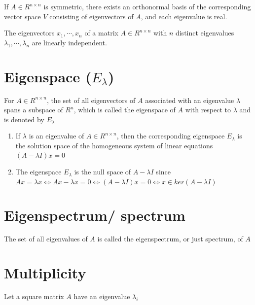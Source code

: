 \begin{theorem}
    If $A \in  R^{n\times n}$ is symmetric, there exists an orthonormal basis of the corresponding vector space $V$ consisting of eigenvectors of $A$, and each eigenvalue is real.
\end{theorem}

\begin{theorem}
    The eigenvectors $x_1, \cdots  , x_n$ of a matrix $A \in  R^{n\times n}$ with $n$ distinct eigenvalues $\lambda_1, \cdots  , \lambda_n$ are linearly independent.
\end{theorem}



\section{Eigenspace ($E_\lambda$)}\label{Eigenspace}
For $A \in  R^{n\times n}$, the set of all eigenvectors of $A$ associated with an eigenvalue $\lambda$  spans a subspace of $R^n$, which is called the eigenspace of $A$ with respect to $\lambda$  and is denoted by $E_\lambda$ 

\begin{enumerate}
    \item If $\lambda$  is an eigenvalue of $A \in  R^{n\times n}$, then the corresponding eigenspace $E_\lambda$  is the solution space of the homogeneous system of linear equations $(A-\lambda I)x = 0$

    \item The eigenspace $E_\lambda$  is the null space of $A - \lambda I$ since\\
    $Ax = \lambda x \Leftrightarrow  Ax - \lambda x = 0 \Leftrightarrow  (A - \lambda I)x = 0 \Leftrightarrow  x \in  ker(A - \lambda I)$
\end{enumerate}



\section{Eigenspectrum/ spectrum}\label{Eigenspectrum/ spectrum}
The set of all eigenvalues of $A$ is called the eigenspectrum, or just spectrum, of $A$


\section{Multiplicity}\label{Multiplicity}
Let a square matrix $A$ have an eigenvalue $\lambda_i$

